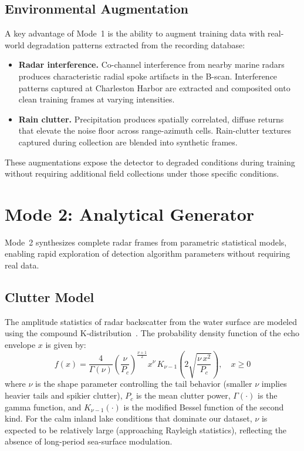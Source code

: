 \documentclass[conf]{new-aiaa}
\begin{document}
\subsection{Environmental Augmentation}

A key advantage of Mode~1 is the ability to augment training data with real-world degradation patterns extracted from the recording database:

\begin{itemize}
    \item \textbf{Radar interference.} Co-channel interference from nearby marine radars produces characteristic radial spoke artifacts in the B-scan. Interference patterns captured at Charleston Harbor are extracted and composited onto clean training frames at varying intensities.
    \item \textbf{Rain clutter.} Precipitation produces spatially correlated, diffuse returns that elevate the noise floor across range-azimuth cells. Rain-clutter textures captured during collection are blended into synthetic frames.
\end{itemize}

These augmentations expose the detector to degraded conditions during training without requiring additional field collections under those specific conditions.

\section{Mode 2: Analytical Generator}
\label{sec:mode2}

Mode~2 synthesizes complete radar frames from parametric statistical models, enabling rapid exploration of detection algorithm parameters without requiring real data.

\subsection{Clutter Model}

The amplitude statistics of radar backscatter from the water surface are modeled using the compound K-distribution~\cite{ward2013sea, watts1987radar}. The probability density function of the echo envelope $x$ is given by:
\begin{equation}
f(x) = \frac{4}{\Gamma(\nu)} \left(\frac{\nu}{P_c}\right)^{\!\frac{\nu+1}{2}} x^{\nu}\, K_{\nu-1}\!\left(2\sqrt{\frac{\nu\, x^2}{P_c}}\right), \quad x \geq 0
\label{eq:kdist}
\end{equation}
where $\nu$ is the shape parameter controlling the tail behavior (smaller $\nu$ implies heavier tails and spikier clutter), $P_c$ is the mean clutter power, $\Gamma(\cdot)$ is the gamma function, and $K_{\nu-1}(\cdot)$ is the modified Bessel function of the second kind. For the calm inland lake conditions that dominate our dataset, $\nu$ is expected to be relatively large (approaching Rayleigh statistics), reflecting the absence of long-period sea-surface modulation.
\end{document}
